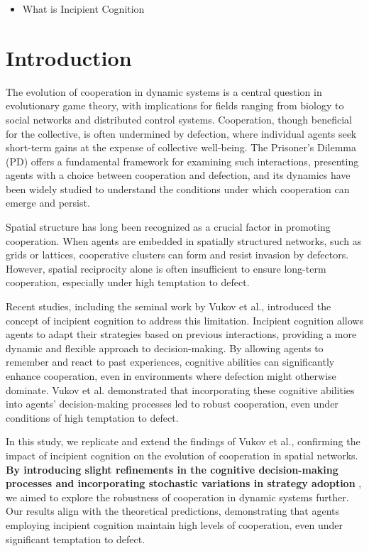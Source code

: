 \documentclass[runningheads]{llncs}
\begin{document}
\begin{itemize}
    \item What is Incipient Cognition
\end{itemize}


\section{Introduction}

The evolution of cooperation in dynamic systems is a central question in evolutionary game theory, with implications for fields ranging from biology to social networks and distributed control systems. Cooperation, though beneficial for the collective, is often undermined by defection, where individual agents seek short-term gains at the expense of collective well-being. The Prisoner’s Dilemma (PD) offers a fundamental framework for examining such interactions, presenting agents with a choice between cooperation and defection, and its dynamics have been widely studied to understand the conditions under which cooperation can emerge and persist.

Spatial structure has long been recognized as a crucial factor in promoting cooperation. When agents are embedded in spatially structured networks, such as grids or lattices, cooperative clusters can form and resist invasion by defectors. However, spatial reciprocity alone is often insufficient to ensure long-term cooperation, especially under high temptation to defect.

Recent studies, including the seminal work by Vukov et al., introduced the concept of incipient cognition to address this limitation. Incipient cognition allows agents to adapt their strategies based on previous interactions, providing a more dynamic and flexible approach to decision-making. By allowing agents to remember and react to past experiences, cognitive abilities can significantly enhance cooperation, even in environments where defection might otherwise dominate. Vukov et al. demonstrated that incorporating these cognitive abilities into agents' decision-making processes led to robust cooperation, even under conditions of high temptation to defect.

In this study, we replicate and extend the findings of Vukov et al., confirming the impact of incipient cognition on the evolution of cooperation in spatial networks. \textbf{By introducing slight refinements in the cognitive decision-making processes and incorporating stochastic variations in strategy adoption} , we aimed to explore the robustness of cooperation in dynamic systems further. Our results align with the theoretical predictions, demonstrating that agents employing incipient cognition maintain high levels of cooperation, even under significant temptation to defect.
\end{document}
